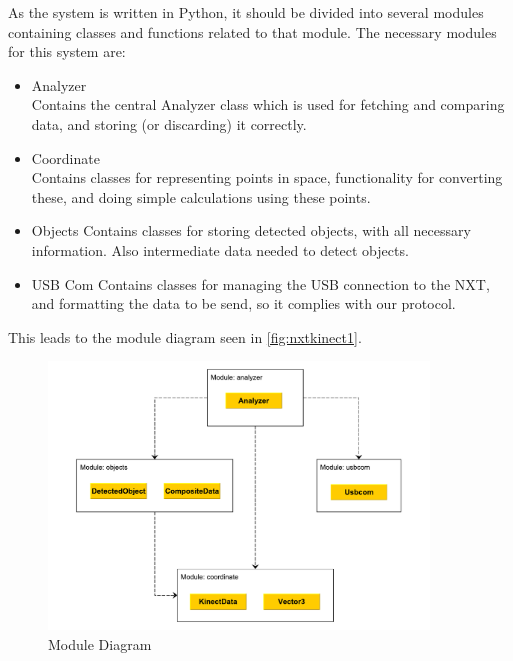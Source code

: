As the system is written in Python, it should be divided into several modules containing classes
and functions related to that module. The necessary modules for this system are:
\begin{itemize}
  \item{Analyzer}\\
  Contains the central Analyzer class which is used for fetching and comparing data, and storing (or discarding) it
  correctly.
  \item{Coordinate}\\
  Contains classes for representing points in space, functionality for converting these, and doing simple calculations
  using these points.
  \item{Objects}
  Contains classes for storing detected objects, with all necessary information. Also intermediate data needed to
  detect objects.
  \item{USB Com}
  Contains classes for managing the USB connection to the NXT, and formatting the data to be send, so it complies with
  our protocol.
\end{itemize}

This leads to the module diagram seen in \autoref{fig:nxtkinect1}.

\begin{figure}[hbtp]
\includegraphics[width=0.90\textwidth]{img/nxtkinect1.pdf}
\caption{Module Diagram} 
\label{fig:nxtkinect1} 
\end{figure}

